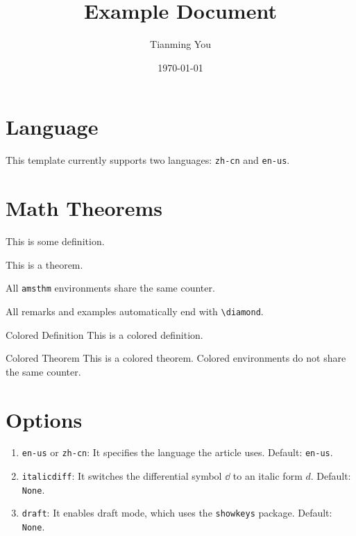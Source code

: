 \documentclass[a4paper,10pt]{article}
\title{Example Document}
\author{Tianming You}
\date{\today}
\begin{document}
\maketitle

\tableofcontents

\newpage

\section{Language}
This template currently supports two languages: \texttt{zh-cn} and \texttt{en-us}.

\section{Math Theorems}
\begin{definition}
    This is some definition.
\end{definition}
\begin{theorem}\label{thm:thm1}
    This is a theorem.
\end{theorem}
\begin{remark}
    All \texttt{amsthm} environments share the same counter.
\end{remark}
\begin{example}
    All remarks and examples automatically end with \texttt{\textbackslash diamond}.
\end{example}
\begin{cthdefinition}{Colored Definition}
    This is a colored definition.
\end{cthdefinition}
\begin{cththeorem}{Colored Theorem}
    This is a colored theorem. Colored environments do not share the same counter.
\end{cththeorem}

\section{Options}
\begin{enumerate}
    \item \texttt{en-us} or \texttt{zh-cn}: It specifies the language the article uses. Default: \texttt{en-us}.
    \item \texttt{italicdiff}: It switches the differential symbol \(\dd\) to an italic form \(d\). Default: \texttt{None}.
    \item \texttt{draft}: It enables draft mode, which uses the \texttt{showkeys} package. Default: \texttt{None}.
\end{enumerate}
\end{document}

